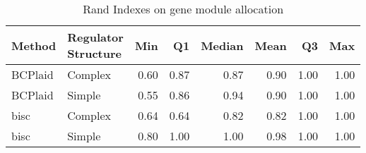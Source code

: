 \begin{table}[ht]
\caption{Rand Indexes on gene module allocation}
\vspace{1.5cm}
\centering
\begin{tabular}{llrrrrrr}
  \toprule
Method & \makecell{Regulator \\ Structure} & Min & Q1 & Median & Mean & Q3 & Max \\ 
  \midrule
BCPlaid & Complex & 0.60 & 0.87 & 0.87 & 0.90 & 1.00 & 1.00 \\ 
  BCPlaid & Simple & 0.55 & 0.86 & 0.94 & 0.90 & 1.00 & 1.00 \\ 
  bisc & Complex & 0.64 & 0.64 & 0.82 & 0.82 & 1.00 & 1.00 \\ 
  bisc & Simple & 0.80 & 1.00 & 1.00 & 0.98 & 1.00 & 1.00 \\ 
   \bottomrule
\end{tabular}
\end{table}
